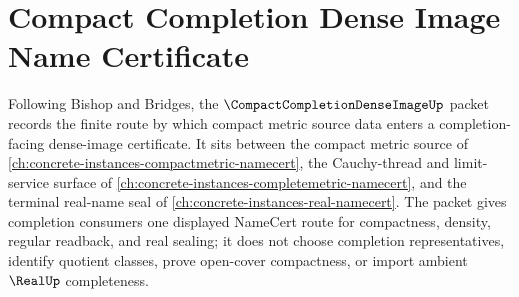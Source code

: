 \chapter{Compact Completion Dense Image Name Certificate}
\label{ch:concrete-instances-compact-completion-dense-image-namecert}

Following Bishop and Bridges, the $\CompactCompletionDenseImageUp$ packet records the finite route by which compact metric source data enters a completion-facing dense-image certificate. It sits between the compact metric source of \autoref{ch:concrete-instances-compactmetric-namecert}, the Cauchy-thread and limit-service surface of \autoref{ch:concrete-instances-completemetric-namecert}, and the terminal real-name seal of \autoref{ch:concrete-instances-real-namecert}. The packet gives completion consumers one displayed NameCert route for compactness, density, regular readback, and real sealing; it does not choose completion representatives, identify quotient classes, prove open-cover compactness, or import ambient $\RealUp$ completeness.

